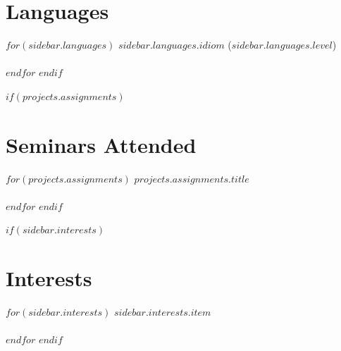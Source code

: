 \documentclass[$fontsize$, a4paper]{article}
\begin{document}
\section*{Languages}
$for(sidebar.languages)$
\emph{$sidebar.languages.idiom$} ($sidebar.languages.level$)\\~\\
$endfor$
$endif$

$if(projects.assignments)$
\section*{Seminars Attended}
$for(projects.assignments)$
$projects.assignments.title$\\~\\
$endfor$
$endif$

$if(sidebar.interests)$
\section*{Interests}
$for(sidebar.interests)$
{$sidebar.interests.item$}\\~\\
$endfor$
$endif$
\end{document}
